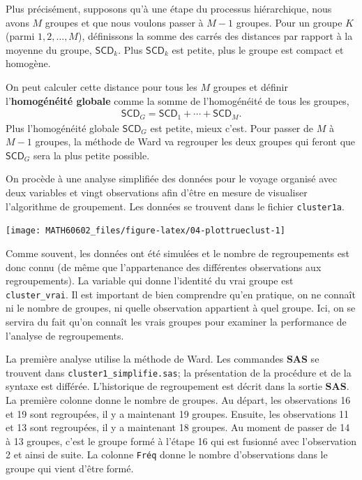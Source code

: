 \documentclass[
  11pt,
  letterpaper,
]{book}
\theoremstyle{definition}
\theoremstyle{definition}
\theoremstyle{definition}
\theoremstyle{remark}
\begin{document}
Plus précisément, supposons qu'à une étape du processus hiérarchique, nous avons \(M\) groupes et que nous voulons passer à \(M-1\) groupes. Pour un groupe \(K\) (parmi \(1, 2, \ldots, M\)), définissons la somme des carrés des distances par rapport à la moyenne du groupe, \(\mathsf{SCD}_k\). Plus \(\mathsf{SCD}_k\) est petite, plus le groupe est compact et homogène.

On peut calculer cette distance pour tous les \(M\) groupes et définir l'\textbf{homogénéité globale} comme la somme de l'homogénéité de tous les groupes,
\begin{align*}
\mathsf{SCD}_G = \mathsf{SCD}_1 + \cdots + \mathsf{SCD}_M.
\end{align*}
Plus l'homogénéité globale \(\mathsf{SCD}_G\) est petite, mieux c'est. Pour passer de \(M\) à \(M-1\) groupes, la méthode de Ward va regrouper les deux groupes qui feront que \(\mathsf{SCD}_G\) sera la plus petite possible.

On procède à une analyse simplifiée des données pour le voyage organisé avec deux variables et vingt observations afin d'être en mesure de visualiser l'algorithme de groupement. Les données se trouvent dans le fichier \texttt{cluster1a}.

\begin{center}\texttt{[image: MATH60602\_files/figure-latex/04-plottrueclust-1]} \end{center}

Comme souvent, les données ont été simulées et le nombre de regroupements est donc connu (de même que l'appartenance des différentes observations aux regroupements). La variable qui donne l'identité du vrai groupe est \texttt{cluster\_vrai}. Il est important de bien comprendre qu'en pratique, on ne connaît ni le nombre de groupes, ni quelle observation appartient à quel groupe. Ici, on se servira du fait qu'on connaît les vrais groupes pour examiner la performance de l'analyse de regroupements.

La première analyse utilise la méthode de Ward. Les commandes \textbf{SAS} se trouvent dans \texttt{cluster1\_simplifie.sas}; la présentation de la procédure et de la syntaxe est différée. L'historique de regroupement est décrit dans la sortie \textbf{SAS}. La première colonne donne le nombre de groupes. Au départ, les observations 16 et 19 sont regroupées, il y a maintenant 19 groupes. Ensuite, les observations 11 et 13 sont regroupées, il y a maintenant 18 groupes. Au moment de passer de 14 à 13 groupes, c'est le groupe formé à l'étape 16 qui est fusionné avec l'observation 2 et ainsi de suite. La colonne \texttt{Fréq} donne le nombre d'observations dans le groupe qui vient d'être formé.
\end{document}
